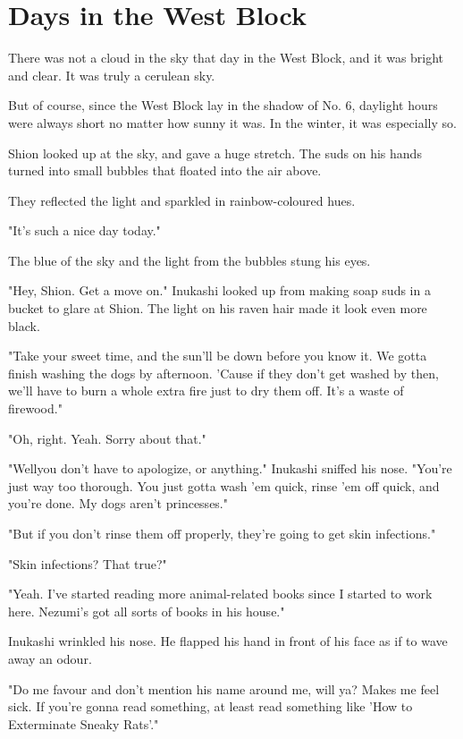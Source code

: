 
\chapter{Days in the West Block}

There was not a cloud in the sky that day in the West Block, and it was
bright and clear. It was truly a cerulean sky.

But of course, since the West Block lay in the shadow of No. 6, daylight
hours were always short no matter how sunny it was. In the winter, it
was especially so.

Shion looked up at the sky, and gave a huge stretch. The suds on his
hands turned into small bubbles that floated into the air above.

They reflected the light and sparkled in rainbow-coloured hues.

"It's such a nice day today."

The blue of the sky and the light from the bubbles stung his eyes.

"Hey, Shion. Get a move on." Inukashi looked up from making soap suds in
a bucket to glare at Shion. The light on his raven hair made it look
even more black.

"Take your sweet time, and the sun'll be down before you know it. We
gotta finish washing the dogs by afternoon. 'Cause if they don't get
washed by then, we'll have to burn a whole extra fire just to dry them
off. It's a waste of firewood."

"Oh, right. Yeah. Sorry about that."

"Well\el you don't have to apologize, or anything." Inukashi sniffed his
nose. "You're just way too thorough. You just gotta wash 'em quick,
rinse 'em off quick, and you're done. My dogs aren't princesses."

"But if you don't rinse them off properly, they're going to get skin
infections."

"Skin infections? That true?"

"Yeah. I've started reading more animal-related books since I started to
work here. Nezumi's got all sorts of books in his house."

Inukashi wrinkled his nose. He flapped his hand in front of his face as
if to wave away an odour.

"Do me favour and don't mention his name around me, will ya? Makes me
feel sick. If you're gonna read something, at least read something like
'How to Exterminate Sneaky Rats'."

